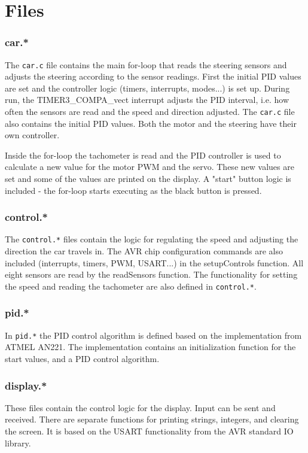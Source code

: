 \documentclass[11pt,a4paper]{report}
\begin{document}
\section*{Files}
\subsubsection*{car.*}
The \verb|car.c| file contains the main for-loop that reads the steering sensors and adjusts the steering according to the sensor readings. First the initial PID values are set and the controller logic (timers, interrupts, modes...) is set up. During run, the TIMER3\_COMPA\_vect interrupt adjusts the PID interval, i.e. how often the sensors are read and the speed and direction adjusted. The \verb|car.c| file also contains the initial PID values. Both the motor and the steering have their own controller.

Inside the for-loop the tachometer is read and the PID controller is used to calculate a new value for the motor PWM and the servo. These new values are set and some of the values are printed on the display. A "start" button logic is included - the for-loop starts executing as the black button is pressed.


\subsubsection*{control.*}
The \verb|control.*| files contain the logic for regulating the speed and adjusting the direction the car travels in. The AVR chip configuration commands are also included (interrupts, timers, PWM, USART...) in the setupControls function. All eight sensors are read by the readSensors function. The functionality for setting the speed and reading the tachometer are also defined in \verb|control.*|.

\subsubsection*{pid.*}
In \verb|pid.*| the PID control algorithm is defined based on the implementation from ATMEL AN221. The implementation contains an initialization function for the start values, and a PID control algorithm.

\subsubsection*{display.*}
These files contain the control logic for the display. Input can be sent and received. There are separate functions for printing strings, integers, and clearing the screen. It is based on the USART functionality from the AVR standard IO library.%
\end{document}
